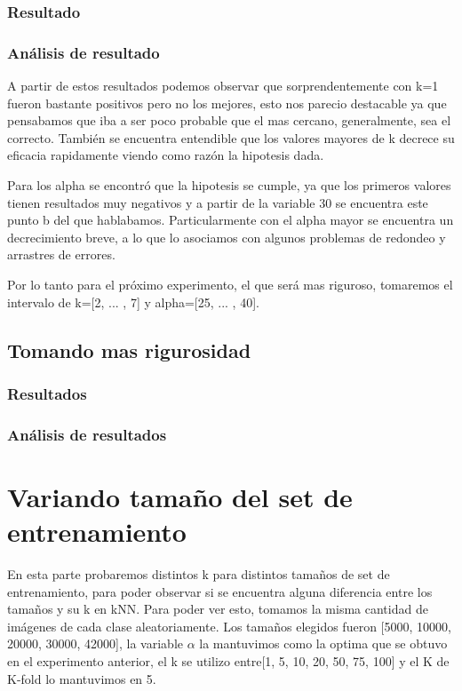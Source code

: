 \subsubsection{Resultado}




\subsubsection{Análisis de resultado}
A partir de estos resultados podemos observar que sorprendentemente con k=1 fueron bastante positivos pero no los mejores, esto nos parecio destacable ya que pensabamos que iba a ser poco probable que el mas cercano, generalmente, sea el correcto. También se encuentra entendible que los valores mayores de k decrece su eficacia rapidamente viendo como razón la hipotesis dada.

Para los alpha se encontró que la hipotesis se cumple, ya que los primeros valores tienen resultados muy negativos y a partir de la variable 30 se encuentra este punto b del que hablabamos. Particularmente con el alpha mayor se encuentra un decrecimiento breve, a lo que lo asociamos con algunos problemas de redondeo y arrastres de errores.

Por lo tanto para el próximo experimento, el que será mas riguroso, tomaremos el intervalo de k=[2, ... , 7] y alpha=[25, ... , 40]. 

\subsection{Tomando mas rigurosidad}

\subsubsection{Resultados}


\subsubsection{Análisis de resultados}



\section{Variando tamaño del set de entrenamiento}

En esta parte probaremos distintos k para distintos tamaños de set de entrenamiento, para poder observar si se encuentra alguna diferencia entre los tamaños y su k en kNN.
Para poder ver esto, tomamos la misma cantidad de imágenes de cada clase aleatoriamente. Los tamaños elegidos fueron [5000, 10000, 20000, 30000, 42000], la variable $\alpha$ la mantuvimos como la optima que se obtuvo en el experimento anterior, el k se utilizo entre[1, 5, 10, 20, 50, 75, 100] y el K de K-fold lo mantuvimos en 5.

